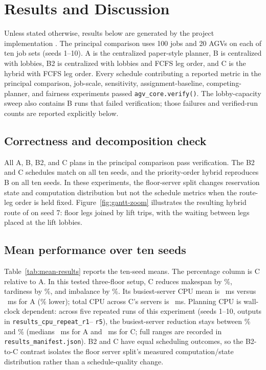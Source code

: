 \section{Results and Discussion}
\label{sec:results-discussion}

Unless stated otherwise, results below are generated by the project
implementation \cite{projectRepo}. The principal comparison uses 100
jobs and 20 AGVs on each of ten job sets (seeds 1--10). A is the centralized
paper-style planner, B is centralized with lobbies, B2 is centralized with
lobbies and FCFS leg order, and C is the hybrid with FCFS leg order. Every
schedule contributing a reported metric in the principal comparison,
job-scale, sensitivity, assignment-baseline, competing-planner, and fairness
experiments passed \texttt{agv\_core.verify()}. The lobby-capacity sweep also
contains B runs that failed verification; those failures and verified-run
counts are reported explicitly below.

\subsection{Correctness and decomposition check}

All A, B, B2, and C plans in the principal comparison pass verification. The
B2 and C schedules match on all ten seeds, and the
priority-order hybrid reproduces B on all ten seeds. In these experiments,
the floor-server split changes reservation state and computation distribution
but not the schedule metrics when the route-leg order is held fixed.
Figure~\ref{fig:gantt-zoom} illustrates the resulting hybrid route of
\GanttZoomAgv{} on seed 7: floor legs joined by lift trips, with the waiting
between legs placed at the lift lobbies.

\subsection{Mean performance over ten seeds}

Table~\ref{tab:mean-results} reports the ten-seed means. The percentage
column is C relative to A. In this tested three-floor setup, C reduces
makespan by \RedMakespanCAabs\%, tardiness by
\RedTardinessCAabs\%, and imbalance by \RedImbalanceCAabs\%. Its busiest-server
CPU mean is \CpuMaxC~ms versus
\CpuMaxA~ms for A (\RedCpuMaxCAabs\% lower); total CPU across C's servers is
\CpuTotalC~ms.
Planning CPU is wall-clock dependent: across five repeated runs of this
experiment (seeds 1--10, outputs in \texttt{results\_cpu\_repeat\_r1}--%
\texttt{r5}), the busiest-server reduction stays between \CpuRepeatRedMin\%
and \CpuRepeatRedMax\%
(medians \CpuRepeatMedianA~ms for A and \CpuRepeatMedianC~ms for C; full
ranges are recorded in
\texttt{results\_manifest.json}). B2 and C
have equal scheduling outcomes, so the B2-to-C contrast isolates the floor
server split's measured computation/state distribution rather than a
schedule-quality change.

